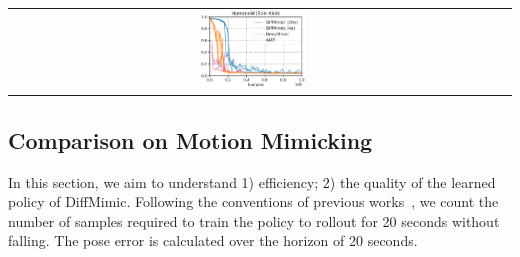 \begin{table}[]
\begin{tabular}{cccc}
         &
         \includegraphics[width=0.23\textwidth]{figures/mixed_spinkick_legend.png}
    \end{tabular}
    \label{fig:imitate_one}
\end{table}

\subsection{Comparison on Motion Mimicking}
In this section, we aim to understand 1) efficiency; 2) the quality of the learned policy of DiffMimic. Following the conventions of previous works~\citep{peng2018deepmimic, peng2021amp, ma2021learning}, we count the number of samples required to train the policy to rollout for 20 seconds without falling. The pose error is calculated over the horizon of 20 seconds.

